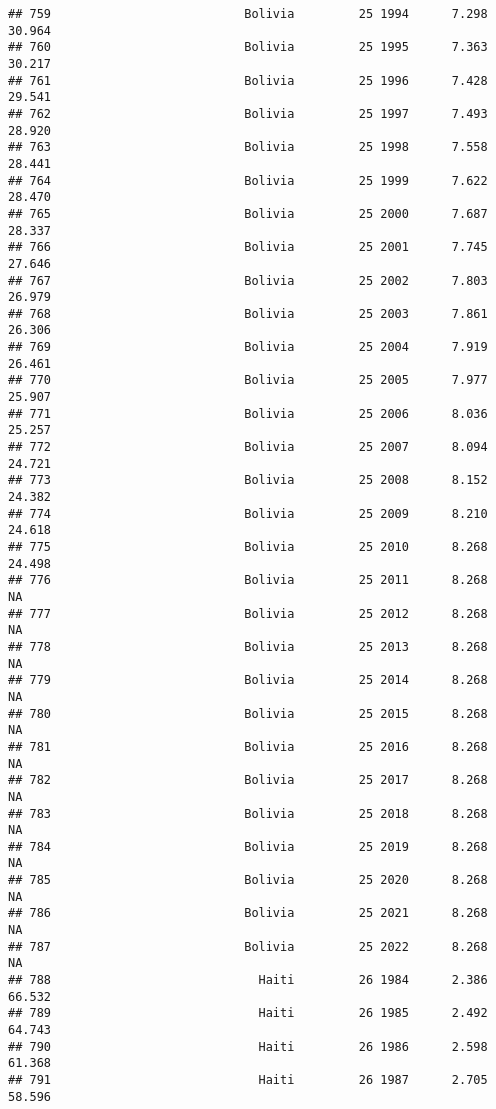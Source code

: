 \documentclass[
]{article}
\begin{document}
\begin{verbatim}
## 759                           Bolivia         25 1994      7.298     30.964
## 760                           Bolivia         25 1995      7.363     30.217
## 761                           Bolivia         25 1996      7.428     29.541
## 762                           Bolivia         25 1997      7.493     28.920
## 763                           Bolivia         25 1998      7.558     28.441
## 764                           Bolivia         25 1999      7.622     28.470
## 765                           Bolivia         25 2000      7.687     28.337
## 766                           Bolivia         25 2001      7.745     27.646
## 767                           Bolivia         25 2002      7.803     26.979
## 768                           Bolivia         25 2003      7.861     26.306
## 769                           Bolivia         25 2004      7.919     26.461
## 770                           Bolivia         25 2005      7.977     25.907
## 771                           Bolivia         25 2006      8.036     25.257
## 772                           Bolivia         25 2007      8.094     24.721
## 773                           Bolivia         25 2008      8.152     24.382
## 774                           Bolivia         25 2009      8.210     24.618
## 775                           Bolivia         25 2010      8.268     24.498
## 776                           Bolivia         25 2011      8.268         NA
## 777                           Bolivia         25 2012      8.268         NA
## 778                           Bolivia         25 2013      8.268         NA
## 779                           Bolivia         25 2014      8.268         NA
## 780                           Bolivia         25 2015      8.268         NA
## 781                           Bolivia         25 2016      8.268         NA
## 782                           Bolivia         25 2017      8.268         NA
## 783                           Bolivia         25 2018      8.268         NA
## 784                           Bolivia         25 2019      8.268         NA
## 785                           Bolivia         25 2020      8.268         NA
## 786                           Bolivia         25 2021      8.268         NA
## 787                           Bolivia         25 2022      8.268         NA
## 788                             Haiti         26 1984      2.386     66.532
## 789                             Haiti         26 1985      2.492     64.743
## 790                             Haiti         26 1986      2.598     61.368
## 791                             Haiti         26 1987      2.705     58.596

\end{verbatim}
\end{document}
